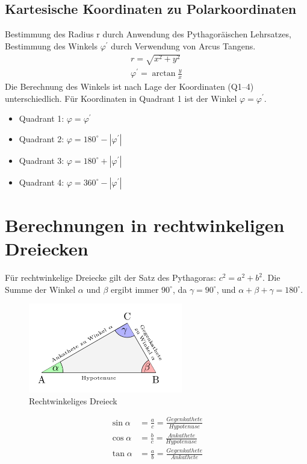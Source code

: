 \documentclass[a4paper]{article}
\begin{document}
\subsection{Kartesische Koordinaten zu Polarkoordinaten}
Bestimmung des Radius r durch Anwendung des Pythagoräischen Lehrsatzes, Bestimmung des Winkels $\varphi^{\prime}$ durch Verwendung von Arcus Tangens.
\begin{align*}
r=\sqrt{x^{2}+y^{2}} \\
\varphi^{\prime}= \arctan \frac{y}{x}
\end{align*}
Die Berechnung des Winkels ist nach Lage der Koordinaten (Q1--4) unterschiedlich. Für Koordinaten in Quadrant 1 ist der Winkel $\varphi = \varphi^{\prime}$.
\begin{itemize}
\item Quadrant 1: $\varphi = \varphi^{\prime}$
\item Quadrant 2: $\varphi = 180^{\circ} - |\varphi^{\prime}|$
\item Quadrant 3: $\varphi = 180^{\circ} + |\varphi^{\prime}|$
\item Quadrant 4: $\varphi = 360^{\circ} - |\varphi^{\prime}|$
\end{itemize}

\section{Berechnungen in rechtwinkeligen Dreiecken}
Für rechtwinkelige Dreiecke gilt der Satz des Pythagoras: $c^{2}=a^{2}+b^{2}$. Die Summe der Winkel $\alpha$ und $\beta$ ergibt immer $90^{\circ}$, da $\gamma = 90^{\circ}$, und $\alpha + \beta + \gamma = 180 ^{\circ}$.
\begin{figure}[h!]
\centering
\includegraphics[width=0.6\textwidth]{images/rwdreieck.png}
\caption{\label{fig:rwdreieck}{Rechtwinkeliges Dreieck}}
\end{figure}
\begin{align*}
\sin\alpha &= \frac{a}{c} = \frac{Gegenkathete}{Hypotenuse} \\
\cos\alpha &= \frac{b}{c} = \frac{Ankathete}{Hypotenuse} \\
\tan\alpha &= \frac{a}{b} = \frac{Gegenkathete}{Ankathete} \\
\end{align*}
\end{document}
